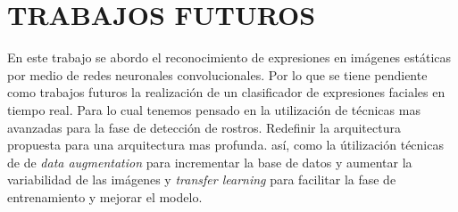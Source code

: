 \chapter*{TRABAJOS FUTUROS}

En este trabajo se abordo el reconocimiento de expresiones en imágenes estáticas por medio de redes neuronales convolucionales. Por lo que se tiene pendiente como trabajos futuros la realización de un clasificador de expresiones faciales en tiempo real. Para lo cual tenemos pensado en la utilización de técnicas mas avanzadas para la fase de detección de rostros. Redefinir la arquitectura propuesta para una arquitectura mas profunda. así, como la útilización técnicas de de \textit{data augmentation} para incrementar la base de datos y aumentar la variabilidad de las imágenes y \textit{transfer learning} para facilitar la fase de entrenamiento y mejorar el modelo.

